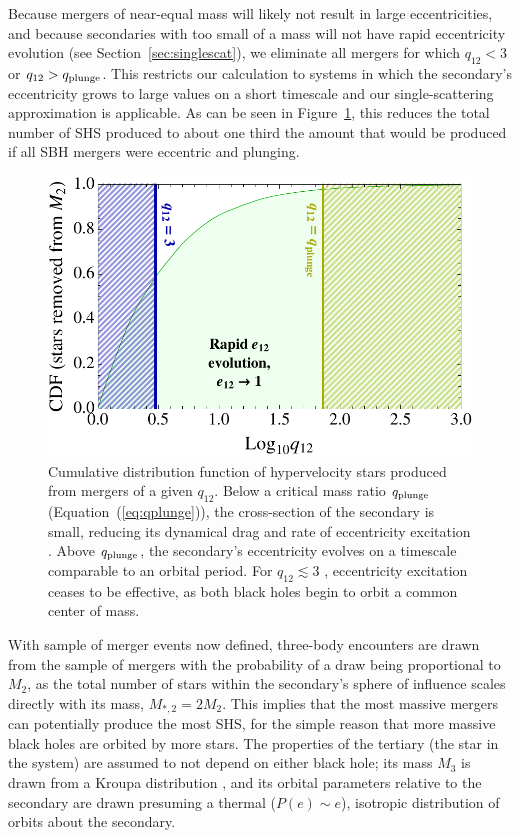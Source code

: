 \documentclass[a4paper,twocolumn]{emulateapj}
\begin{document}
{Because mergers of near-equal mass will likely not result in large eccentricities, and because secondaries with too small of a mass will not have rapid eccentricity evolution (see Section~\ref{sec:singlescat}), we eliminate all mergers for which $q_{12} < 3$ or $q_{12} > q_{\rm plunge}$. This restricts our calculation to systems in which the secondary's eccentricity grows to large values on a short timescale and our single-scattering approximation is applicable. As can be seen in Figure~\ref{fig:qplunge}, this reduces the total number of SHS produced to about one third the amount that would be produced if all SBH mergers were eccentric and plunging.

\begin{figure}
\centering\includegraphics[width=\linewidth,clip=true]{qplunge}
\caption{Cumulative distribution function of hypervelocity stars produced from mergers of a given $q_{12}$. Below a critical mass ratio $q_{\rm plunge}$ (Equation~(\ref{eq:qplunge})), the cross-section of the secondary is small, reducing its dynamical drag and rate of eccentricity excitation \citep{Iwasawa:2011a}. Above $q_{\rm plunge}$, the secondary's eccentricity evolves on a timescale comparable to an orbital period. For $q_{12} \lesssim 3$ \citep{Sesana:2010a}, eccentricity excitation ceases to be effective, as both black holes begin to orbit a common center of mass.}
\label{fig:qplunge}
\end{figure}

With sample of merger events now defined, three-body encounters are drawn from the sample of mergers with the probability of a draw being proportional to $M_{2}$, as the total number of stars within the secondary's sphere of influence scales directly with its mass, $M_{\ast,2} = 2 M_{2}$. This implies that the most massive mergers can potentially produce the most SHS, for the simple reason that more massive black holes are orbited by more stars. The properties of the tertiary (the star in the system) are assumed to not depend on either black hole; its mass $M_{3}$ is drawn from a Kroupa distribution \citep{Kroupa:2001a}, and its orbital parameters relative to the secondary are drawn presuming a thermal ($P(e) \sim e$), isotropic distribution of orbits about the secondary.

}
\end{document}
